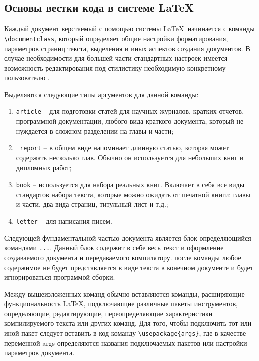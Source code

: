 \subsection{Основы вестки кода в системе \LaTeX}
    Каждый документ верстаемый с помощью системы \LaTeX\verb| |начинается с команды \verb|\documentclаss|, который определяет общие настройки форматирования, параметров страниц текста, выделения и иных аспектов создания документов. В случае необходимости для большей части стандартных настроек имеется возможность редактирования под стилистику необходимую конкретному пользователю \cite{25}.

    Выделяются следующие типы аргументов для данной команды:

    \begin{enumerate}
        \item \verb|article| -- для подготовки статей для научных журналов, кратких отчетов, программной документации, любого вида краткого документа, который не нуждается в сложном разделении на главы и части;
        \item \verb| report| -- в общем виде напоминает длинную статью, которая может содержать несколько глав. Обычно он используется для небольших книг и дипломных работ;
        \item  \verb|book| -- используется для набора реальных книг. Включает в себя все виды стандартов набора текста, которые можно ожидать от печатной книги: главы и части, два вида страниц, титульный лист и т.д.;
        \item  \verb|letter| -- для написания писем.

    \end{enumerate}

    Следующей фундаментальной частью документа является блок определяющийся командами \verb|...|. Данный блок содержит в себе весь текст и оформление создаваемого документа и передаваемого компилятору. после команды \verb|| любое содержимое не будет представляется в виде текста в конечном документе и будет игнорироваться программой сборки. 

    Между вышеизложенных команд обычно вставляются команды, расширяющие функциональность \LaTeX, подключающие различные пакеты инструментов, определяющие, редактирующие, переопределяющие характеристики компилируемого текста или других команд. Для того, чтобы подключить тот или иной пакет следует вставить в код команду \verb|\usepackage{args}|, где в качестве переменной args определяются названия подключаемых пакетов или настройки параметров документа.

